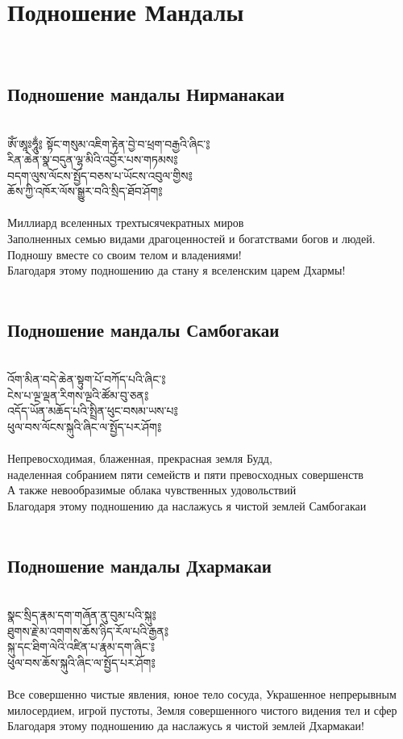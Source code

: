 \section{Подношение Мандалы}
\\
\subsection*{Подношение мандалы Нирманакаи}
\\
\ti
ཨོཾ་ཨཱཿཧཱུྂ༔ སྟོང་གསུམ་འཇིག་རྟེན་བྱེ་བ་ཕྲག་བརྒྱའི་ཞིང་༔\\
རིན་ཆེན་སྣ་བདུན་ལྷ་མིའི་འབྱོར་པས་གཏམས༔ \\
བདག་ལུས་ལོངས་སྤྱོད་བཅས་པ་ཡོངས་འབུལ་གྱིས༔ \\
ཆོས་ཀྱི་འཁོར་ལོས་སྒྱུར་བའི་སྲིད་ཐོབ་ཤོག༔ \\
\\
\ru
Миллиард вселенных трехтысячекратных миров\\
Заполненных семью видами драгоценностей и богатствами богов и людей.\\
Подношу вместе со своим телом и владениями!\\
Благодаря этому подношению да стану я вселенским царем Дхармы!\\
\\
\subsection*{Подношение мандалы Самбогакаи}
\\
\ti
འོག་མིན་བདེ་ཆེན་སྟུག་པོ་བཀོད་པའི་ཞིང་༔ \\
ངེས་པ་ལྔ་ལྡན་རིགས་ལྔའི་ཚོམ་བུ་ཅན༔  \\
འདོད་ཡོན་མཆོད་པའི་སྤྲིན་ཕུང་བསམ་ཡས་པ༔ \\
ཕུལ་བས་ལོངས་སྐུའི་ཞིང་ལ་སྤྱོད་པར་ཤོག༔ \\
\\
\ru
Непревосходимая, блаженная, прекрасная земля Будд,\\
наделенная собранием пяти семейств и пяти превосходных совершенств\\
А также невообразимые облака чувственных удовольствий\\
Благодаря этому подношению да наслажусь я чистой землей Самбогакаи\\
\\
\subsection*{Подношение мандалы Дхармакаи}
\\
\ti
སྣང་སྲིད་རྣམ་དག་གཞོན་ནུ་བུམ་པའི་སྐུ༔ \\
ཐུགས་རྗེ་མ་འགགས་ཆོས་ཉིད་རོལ་པའི་རྒྱན༔\\
སྐུ་དང་ཐིག་ལེའི་འཛིན་པ་རྣམ་དག་ཞིང་༔\\
ཕུལ་བས་ཆོས་སྐུའི་ཞིང་ལ་སྤྱོད་པར་ཤོག༔\\
\\
\ru
Все совершенно чистые явления, юное тело сосуда,
Украшенное непрерывным милосердием, игрой пустоты,
Земля совершенного чистого видения тел и сфер
Благодаря этому подношению да наслажусь я чистой землей Дхармакаи!

